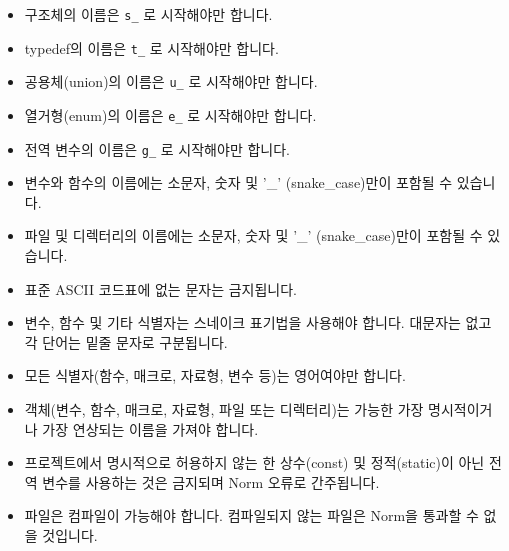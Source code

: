 \documentclass{42-ko}
\begin{document}
        \begin{itemize}

            \item 구조체의 이름은 \texttt{s\_} 로 시작해야만 합니다.

            \item typedef의 이름은 \texttt{t\_} 로 시작해야만 합니다.

            \item 공용체(union)의 이름은 \texttt{u\_} 로 시작해야만 합니다.

            \item 열거형(enum)의 이름은 \texttt{e\_} 로 시작해야만 합니다.

            \item 전역 변수의 이름은 \texttt{g\_} 로 시작해야만 합니다.

            \item 변수와 함수의 이름에는 소문자, 숫자 및
                '\_' (snake\_case)만이 포함될 수 있습니다.

            \item 파일 및 디렉터리의 이름에는 소문자, 숫자 및
                '\_' (snake\_case)만이 포함될 수 있습니다.

            \item 표준 ASCII 코드표에 없는 문자는 금지됩니다.

            \item 변수, 함수 및 기타 식별자는 스네이크 표기법을 사용해야 합니다.
                대문자는 없고 각 단어는 밑줄 문자로 구분됩니다.

            \item 모든 식별자(함수, 매크로, 자료형, 변수 등)는 영어여야만 합니다.

            \item 객체(변수, 함수, 매크로, 자료형, 파일 또는 디렉터리)는
                가능한 가장 명시적이거나 가장 연상되는 이름을 가져야 합니다.

            \item 프로젝트에서 명시적으로 허용하지 않는 한 상수(const) 및 정적(static)이 아닌
                전역 변수를 사용하는 것은 금지되며 Norm 오류로 간주됩니다.

            \item 파일은 컴파일이 가능해야 합니다. 컴파일되지 않는 파일은
                Norm을 통과할 수 없을 것입니다.
        \end{itemize}
\newpage

\end{document}
